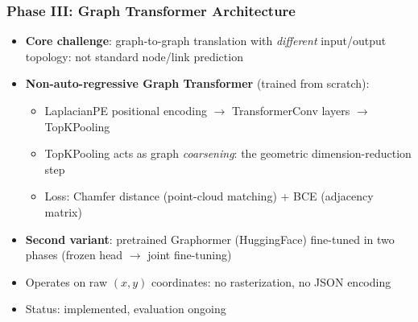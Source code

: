 \begin{frame}[fragile]\frametitle{Phase III: Graph Transformer Architecture}

  \begin{itemize}
    \item \textbf{Core challenge}: graph-to-graph translation with \textit{different} input/output topology: not standard node/link prediction
    \item \textbf{Non-auto-regressive Graph Transformer} (trained from scratch):
      \begin{itemize}
        \item LaplacianPE positional encoding $\rightarrow$ TransformerConv layers $\rightarrow$ TopKPooling
        \item TopKPooling acts as graph \textit{coarsening}: the geometric dimension-reduction step
        \item Loss: Chamfer distance (point-cloud matching) + BCE (adjacency matrix)
      \end{itemize}
    \item \textbf{Second variant}: pretrained Graphormer (HuggingFace) fine-tuned in two phases (frozen head $\rightarrow$ joint fine-tuning)
    \item Operates on raw $(x,y)$ coordinates: no rasterization, no JSON encoding
    \item Status: \alert{implemented, evaluation ongoing}
  \end{itemize}

\end{frame}


